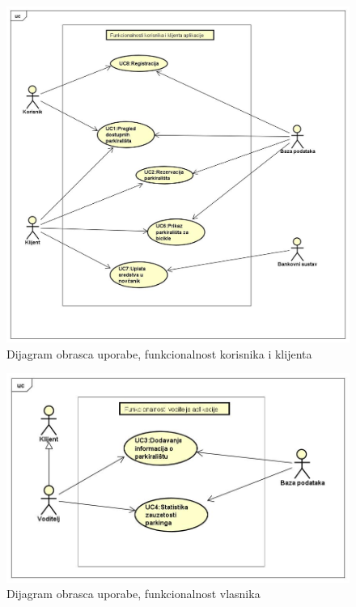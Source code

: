 \begin{figure}
	\centering
	\includegraphics[width=1\linewidth,height=0.7\textheight]{dijagrami/dijagramKlijent.jpg}
	\caption{ Dijagram obrasca uporabe, funkcionalnost korisnika i klijenta}
	\label{fig:dijagramklijent}
	
\end{figure}

\begin{figure}
	\centering
	\includegraphics[width=1\linewidth]{dijagrami/dijagramVoditelj}
	\caption{Dijagram obrasca uporabe, funkcionalnost vlasnika}
	\label{fig:dijagramvoditelj}
\end{figure}

